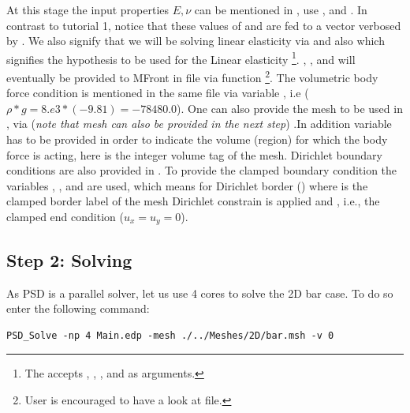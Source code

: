 At this stage the input properties \(E,\nu\) can be mentioned in
, use , and .
In contrast to tutorial 1, notice that these values of  and
 are fed to a vector  verbosed by
. We also signify
that we will be solving linear elasticity via
 and also
 which signifies the
hypothesis to be used for the Linear elasticity
\footnote{The  accepts ,  , ,  and   as arguments.}.
, , and 
will eventually be provided to MFront in  file
via  function
\footnote{User is encouraged to have a look at  file.}.
The volumetric body force condition is mentioned in the same file via
variable , i.e (\(\rho*g=8.e3*(-9.81)=-78480.0\)).
One can also provide the mesh to be used in ,
via 
(\textit{note that mesh can also be provided in the next step}) .In
addition variable  has to be provided in order to indicate
the volume (region) for which the body force is acting, here  is
the integer volume tag of the mesh. Dirichlet boundary conditions are
also provided in . To provide the clamped
boundary condition the variables , , and
 are used, which means for Dirichlet border 
() where  is the clamped border label of the mesh
Dirichlet constrain is applied and ,  i.e.,
the clamped end condition (\(u_x=u_y=0\)).

\subsection{Step 2: Solving}

As PSD is a parallel solver, let us use 4 cores to solve the 2D bar
case. To do so enter the following command:

\begin{lstlisting}[style=BashInputStyle]
PSD_Solve -np 4 Main.edp -mesh ./../Meshes/2D/bar.msh -v 0
\end{lstlisting}

